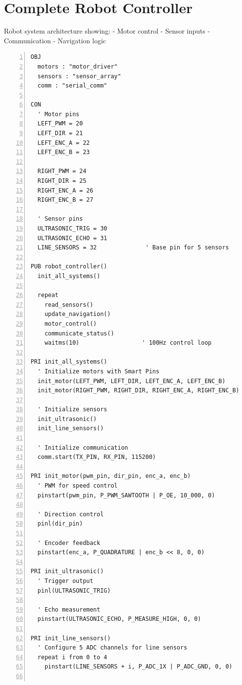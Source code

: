 \documentclass[11pt,a4paper,oneside,english]{book}
\begin{document}
\hypertarget{complete-robot-controller}{%
\section{Complete Robot Controller}\label{complete-robot-controller}}

Robot system architecture showing: - Motor control - Sensor inputs -
Communication - Navigation logic

\begin{Spin2Block}
\begin{Verbatim}[numbers=left,numbersep=5pt,xleftmargin=15pt]
OBJ
  motors : "motor_driver"
  sensors : "sensor_array"
  comm : "serial_comm"
  
CON
  ' Motor pins
  LEFT_PWM = 20
  LEFT_DIR = 21
  LEFT_ENC_A = 22
  LEFT_ENC_B = 23
  
  RIGHT_PWM = 24
  RIGHT_DIR = 25
  RIGHT_ENC_A = 26
  RIGHT_ENC_B = 27
  
  ' Sensor pins
  ULTRASONIC_TRIG = 30
  ULTRASONIC_ECHO = 31
  LINE_SENSORS = 32              ' Base pin for 5 sensors
  
PUB robot_controller()
  init_all_systems()
  
  repeat
    read_sensors()
    update_navigation()
    motor_control()
    communicate_status()
    waitms(10)                  ' 100Hz control loop

PRI init_all_systems()
  ' Initialize motors with Smart Pins
  init_motor(LEFT_PWM, LEFT_DIR, LEFT_ENC_A, LEFT_ENC_B)
  init_motor(RIGHT_PWM, RIGHT_DIR, RIGHT_ENC_A, RIGHT_ENC_B)
  
  ' Initialize sensors
  init_ultrasonic()
  init_line_sensors()
  
  ' Initialize communication
  comm.start(TX_PIN, RX_PIN, 115200)

PRI init_motor(pwm_pin, dir_pin, enc_a, enc_b)
  ' PWM for speed control
  pinstart(pwm_pin, P_PWM_SAWTOOTH | P_OE, 10_000, 0)
  
  ' Direction control
  pinl(dir_pin)
  
  ' Encoder feedback
  pinstart(enc_a, P_QUADRATURE | enc_b << 8, 0, 0)

PRI init_ultrasonic()
  ' Trigger output
  pinl(ULTRASONIC_TRIG)
  
  ' Echo measurement
  pinstart(ULTRASONIC_ECHO, P_MEASURE_HIGH, 0, 0)

PRI init_line_sensors()
  ' Configure 5 ADC channels for line sensors
  repeat i from 0 to 4
    pinstart(LINE_SENSORS + i, P_ADC_1X | P_ADC_GND, 0, 0)


\end{Verbatim}
\end{Spin2Block}
\end{document}
